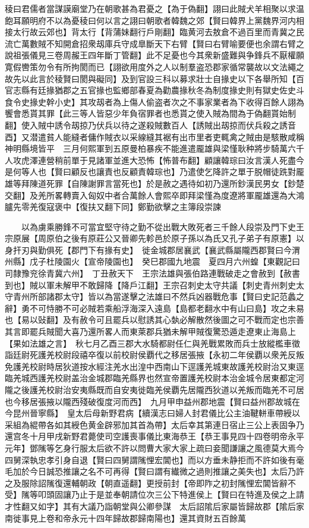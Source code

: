 稜曰君儒者當謀謨廟堂乃在朝歌甚為君憂之【為于偽翻】詡曰此賊犬羊相聚以求温飽耳願明府不以為憂稜曰何以言之詡曰朝歌者韓魏之郊【賢曰韓界上黨魏界河内相接太行故云郊也】背太行【背蒲妹翻行戶剛翻】臨黄河去敖倉不過百里而青冀之民流亡萬數賊不知開倉招衆刼庫兵守成臯斷天下右臂【賢曰右臂喻要便也余謂右臂之說祖張儀見三卷周赧王四年斷丁管翻】此不足憂也今其衆新盛難與争鋒兵不厭權願寛假轡策勿令有所拘閡而已【詡欲用度外之人以制羣盗恐郡家循常襲故以文法繩之故先以此言於稜賢曰閡與礙同】及到官設三科以募求壯士自掾史以下各舉所知【百官志縣有廷掾猶郡之五官掾也監鄉部春夏為勸農掾秋冬為制度掾史則有獄史佐史斗食令史掾史幹小史】其攻刼者為上傷人偷盗者次之不事家業者為下收得百餘人詡為饗會悉貰其罪【此三等人皆惡少年負宿罪者也悉貰之使入賊為間為于偽翻貰始制翻】使入賊中誘令刼掠乃伏兵以待之遂殺賊數百人【誘賊出刼掠而伏兵殺之誘音酉】又潜遣貧人能縫者傭作賊衣以采線縫其裾有出市里者吏輒禽之賊由是駭散咸稱神明縣境皆平　三月何熙軍到五原曼柏暴疾不能進遣龎雄與梁慬耿种將步騎萬六千人攻虎澤連營稍前單于見諸軍並進大恐怖【怖普布翻】顧讓韓琮曰汝言漢人死盡今是何等人也【賢曰顧反也讓責也反顧責韓琮也】乃遣使乞降許之單于脱帽徒跣對龎雄等拜陳道死罪【自陳謝罪言當死也】於是赦之遇待如初乃還所鈔漢民男女【鈔楚交翻】及羌所畧轉賣入匈奴中者合萬餘人會熙卒即拜梁慬為度遼將軍龎雄還為大鴻臚先零羌復寇褒中【復扶又翻下同】鄭勤欲擊之主簿段崇諫

　　以為虜乘勝鋒不可當宜堅守待之勤不從出戰大敗死者三千餘人段崇及門下史王宗原展【周原伯之後有原莊公又晉卿先軫邑於原子孫以為氏又孔子弟子有原憲】以身扞刃與勤俱死【郡門下有掾有史】　徙金城郡居襄武【襄武縣屬隴西郡賢曰今渭州縣】戊子杜陵園火【宣帝陵園也】　癸巳郡國九地震　夏四月六州蝗【東觀記曰司隸豫兖徐青冀六州】　丁丑赦天下　王宗法雄與張伯路連戰破走之會赦到【赦書到也】賊以軍未解甲不敢歸降【降戶江翻】王宗召刺史太守共議【刺史青州刺史太守青州所部諸郡太守】皆以為當遂擊之法雄曰不然兵凶器戰危事【賢曰史記范蠡之辭】勇不可恃勝不可必賊若乘船浮海深入遠島【島都老翻水中有山曰島】攻之未易也【易以䜴翻】及有赦令可且罷兵以慰誘其心埶必解散然後圖之可不戰而定也宗善其言即罷兵賊聞大喜乃還所畧人而東萊郡兵猶未解甲賊復驚恐遁走遼東止海島上【果如法雄之言】　秋七月乙酉三郡大水騎都尉任仁與羌戰累敗而兵士放縱檻車徵詣廷尉死護羌校尉段禧卒復以前校尉侯覇代之移居張掖【永初二年侯覇以衆羌反叛免護羌校尉時居狄道按水經注羌水出湟中西南山下逕護羌城東故護羌校尉治又東逕臨羌城西護羌校尉盖治金城郡臨羌縣界也然宣帝置護羌校尉本治金城令居東都定河隴之後護羌校尉治安夷縣既而自安夷徙臨羌侯覇先居隴西狄道以羌叛而臨羌不可居也今移居張掖以隴西殘破復度河而西】　九月甲申益州郡地震【賢曰益州郡故城在今昆州晉寧縣】　皇太后母新野君病【續漢志曰婦人封君儀比公主油鞬軿車帶綬以采組為緄帶各如其綬色黄金辟邪加其首為帶】太后幸其第連日宿止三公上表固争乃還宫冬十月甲戌新野君薨使司空護喪事儀比東海恭王【恭王事見四十四卷明帝永平元年】鄧隲等乞身行服太后欲不許以問曹大家大家上疏曰妾聞謙讓之風德莫大焉今四舅深執忠孝引身自退【賢曰四舅謂隲悝宏閶也】而以方垂未静拒而不許如後有毫毛加於今日誠恐推讓之名不可再得【賢曰謂有纎微之過則推讓之美失也】太后乃許之及服除詔隲復還輔朝政【朝直遥翻】更授前封【帝即阼之初封隲悝宏閶皆辭不受】隲等叩頭固讓乃止于是並奉朝請位次三公下特進侯上【賢曰在特進及侯之上請才性翻又如字】其有大議乃詣朝堂與公卿參謀　太后詔隂后家屬皆歸故郡【隂后家南徙事見上卷和帝永元十四年歸故郡歸南陽也】還其資財五百餘萬

